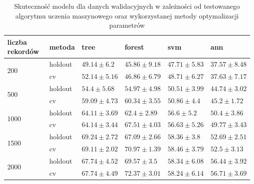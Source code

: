 \begin{table}[]
\centering
\begin{tabular}{|l|l|l|l|l|l|}
\hline
liczba rekordów       & metoda   & tree & forest & svm & ann \\ \hline
\multirow{2}{*}{200}     & holdout    & $ 49.14 \pm 6.2$ & $45.86 \pm 9.18$ & $47.71 \pm 5.83$ & $37.57 \pm 8.48$ \\ \cline{2-6} 
                         & cv         & $52.14 \pm 5.16$ & $46.86 \pm 6.79$ & $48.71 \pm 6.27$ & $37.63 \pm 7.17$ \\ \hline
\multirow{2}{*}{500}     & holdout    & $54.4 \pm 5.68$ & $54.97 \pm 4.98$ & $50.51 \pm 3.99$ & $44.74 \pm 3.02$ \\ \cline{2-6} 
                         & cv         & $59.09 \pm 4.73$ & $60.34 \pm 3.55$ & $50.86 \pm 4.4$ & $45.2 \pm 1.72$ \\ \hline
\multirow{2}{*}{1000}    & holdout    & $64.11 \pm 3.69$ & $62.4 \pm 2.89$ & $56.6 \pm 5.2$ & $50.4 \pm 3.86$ \\ \cline{2-6} 
                         & cv         & $64.14 \pm 3.44$ & $67.51 \pm 4.03$ & $56.63 \pm 5.26$ & $49.77 \pm 3.43$ \\\hline
\multirow{2}{*}{1500}    & holdout    &$ 69.24 \pm 2.72$ & $67.09 \pm 2.66$ & $58.36 \pm 3.8$ & $52.69 \pm 2.51$ \\ \cline{2-6} 
                         & cv         & $69.11 \pm 2.02$ & $70.97 \pm 1.39$ & $58.46 \pm 3.79$ & $52.5 \pm 3.13$ \\ \hline
\multirow{2}{*}{2000}    & holdout    & $67.74 \pm 4.52$ & $69.57 \pm 3.5$ & $58.34 \pm 6.08$ & $56.44 \pm 3.92$ \\ \cline{2-6} 
                         & cv         & $67.74 \pm 4.49$ & $72.37 \pm 3.01$ & $58.24 \pm 6.14$ & $56.71 \pm 3.69$ \\ \hline
\end{tabular}
\caption{Skuteczność modelu dla danych walidacyjnych w zależności od testowanego algorytmu uczenia maszynowego oraz wykorzystanej metody optymalizacji parametrów} \label{table:cv}
\end{table}

\newcommand{\cvsize}{1}


